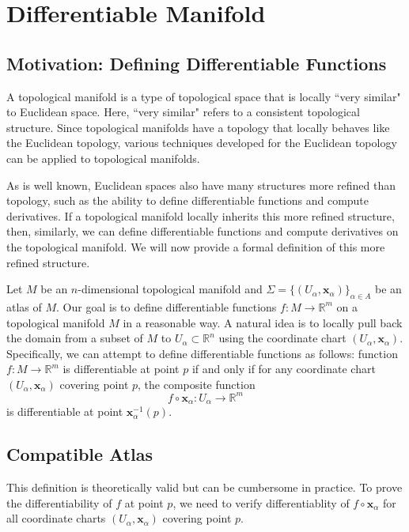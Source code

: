 \documentclass{report}
\begin{document}
\section{Differentiable Manifold}
\subsection{Motivation: Defining Differentiable Functions}
A topological manifold is a type of topological space that is locally ``very similar" to Euclidean space. Here, ``very similar" refers to a consistent topological structure. Since topological manifolds have a topology that locally behaves like the Euclidean topology, various techniques developed for the Euclidean topology can be applied to topological manifolds. 

As is well known, Euclidean spaces also have many structures more refined than topology, such as the ability to define differentiable functions and compute derivatives. If a topological manifold locally inherits this more refined structure, then, similarly, we can define differentiable functions and compute derivatives on the topological manifold. We will now provide a formal definition of this more refined structure.

Let $M$ be an $n$-dimensional topological manifold and $\Sigma=\{(U_\alpha,\mathbf{x}_\alpha)\}_{\alpha\in
A}$ be an atlas of $M$. Our goal is to define differentiable functions $f:M\to \mathbb{R}^m$ on a topological manifold $M$ in a reasonable way. A natural idea is to locally pull back the domain from a subset of $M$ to $U_\alpha\subset\mathbb{R}^n$ using the coordinate chart $(U_\alpha,\mathbf{x}_\alpha)$. Specifically, we can attempt to define differentiable functions as follows: function $f:M\to \mathbb{R}^m$ is differentiable at point $p$ if and only if for any coordinate chart $(U_\alpha,\mathbf{x}_\alpha)$ covering point $p$, the composite function
\[
    f\circ \mathbf{x}_\alpha:U_\alpha\longrightarrow \mathbb{R}^m
\]
is differentiable at point $\mathbf{x}^{-1}_\alpha(p)$.

\subsection{Compatible Atlas}
This definition is theoretically valid but can be cumbersome in practice. To prove the differentiability of $f$ at point $p$, we need to verify differentiablity of $f\circ \mathbf{x}_\alpha$ for all coordinate charts $(U_\alpha,\mathbf{x}_\alpha)$ covering point $p$. 
\end{document}
